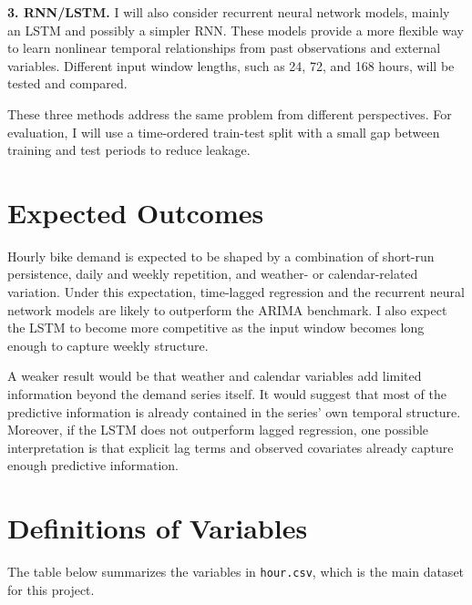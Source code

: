 \documentclass[11pt,letterpaper]{article}
\begin{document}
\textbf{3. RNN/LSTM.} I will also consider recurrent neural network models, mainly an LSTM and possibly a simpler RNN. These models provide a more flexible way to learn nonlinear temporal relationships from past observations and external variables. Different input window lengths, such as 24, 72, and 168 hours, will be tested and compared.

These three methods address the same problem from different perspectives. For evaluation, I will use a time-ordered train-test split with a small gap between training and test periods to reduce leakage.

\section{Expected Outcomes}

Hourly bike demand is expected to be shaped by a combination of short-run persistence, daily and weekly repetition, and weather- or calendar-related variation. Under this expectation, time-lagged regression and the recurrent neural network models are likely to outperform the ARIMA benchmark. I also expect the LSTM to become more competitive as the input window becomes long enough to capture weekly structure.

A weaker result would be that weather and calendar variables add limited information beyond the demand series itself. It would suggest that most of the predictive information is already contained in the series' own temporal structure. Moreover, if the LSTM does not outperform lagged regression, one possible interpretation is that explicit lag terms and observed covariates already capture enough predictive information.


\newpage



\appendix

\section{Definitions of Variables}

The table below summarizes the variables in \texttt{hour.csv}, which is the main dataset for this project.
\end{document}
